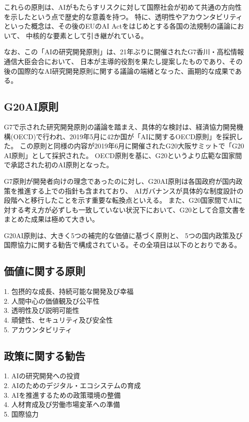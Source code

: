 これらの原則は、AIがもたらすリスクに対して国際社会が初めて共通の方向性を示したという点で歴史的な意義を持つ。
特に、透明性やアカウンタビリティといった概念は、その後のEUのAI Actをはじめとする各国の法規制の議論において、
中核的な要素として引き継がれている。

なお、この「AIの研究開発原則」は、21年ぶりに開催されたG7香川・高松情報通信大臣会合において、
日本が主導的役割を果たし提案したものであり、その後の国際的なAI研究開発原則に関する議論の端緒となった、画期的な成果である。


\subsection{G20AI原則}
G7で示された研究開発原則の議論を踏まえ、具体的な検討は、経済協力開発機構(OECD)で行われ、2019年5月に42か国が「AIに関するOECD原則」を採択した。
この原則と同様の内容が2019年6月に開催されたG20大阪サミットで「G20 AI原則」として採択された。
OECD原則を基に、G20というより広範な国家間で承認された初のAI原則となった。

G7原則が開発者向けの理念であったのに対し、G20AI原則は各国政府が国内政策を推進する上での指針も含まれており、
AIガバナンスが具体的な制度設計の段階へと移行したことを示す重要な転換点といえる。
また、G20国家間でAIに対する考え方が必ずしも一致していない状況下において、G20として合意文書をまとめた成果は極めて大きい。

G20AI原則は、大きく5つの補完的な価値に基づく原則と、
5つの国内政策及び国際協力に関する勧告で構成されている。その全項目は以下のとおりである。

\subsection*{価値に関する原則} %
\begin{description}
  \item[1. 包摂的な成長、持続可能な開発及び幸福]
  \item[2. 人間中心の価値観及び公平性]
  \item[3. 透明性及び説明可能性]
  \item[4. 頑健性、セキュリティ及び安全性]
  \item[5. アカウンタビリティ]
\end{description}

\subsection*{政策に関する勧告}
\begin{description}
  \item[1. AIの研究開発への投資]
  \item[2. AIのためのデジタル・エコシステムの育成]
  \item[3. AIを推進するための政策環境の整備]
  \item[4. 人材育成及び労働市場変革への準備]
  \item[5. 国際協力]
\end{description}


